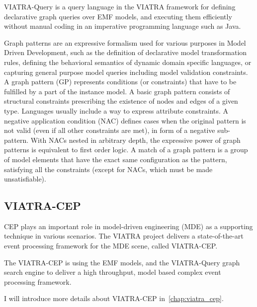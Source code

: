 VIATRA-Query is a query language in the VIATRA framework for defining declarative graph queries over EMF models, and executing them efficiently without manual coding in an imperative programming language such as Java\citep{IncQuery}.

Graph  patterns are  an  expressive  formalism used for various purposes in Model Driven Development,  such  as  the definition of  declarative  model transformation  rules,  defining  the  behavioral  semantics of dynamic domain specific languages, or capturing general purpose model queries including model validation constraints. A graph pattern (GP) represents  conditions  (or  constraints)  that  have  to be fulfilled by a part of the instance model. A basic graph pattern consists of structural constraints prescribing the existence of nodes and edges of a given type. Languages usually include a way to express attribute constraints. A negative application condition (NAC) defines cases when the original pattern is not valid (even if all other constraints are met), in form of a negative sub-pattern. With NACs nested in arbitrary depth, the expressive power of graph patterns is equivalent to first order logic. A match of a graph pattern is a group of model elements that have the exact same configuration as the pattern, satisfying all the constraints (except for NACs, which must be made unsatisfiable)\citep{bergmann2010incremental}.


\subsection{VIATRA-CEP}
CEP plays an important role in model-driven engineering (MDE) as a supporting technique in various scenarios. The VIATRA project delivers a state-of-the-art event processing framework for the MDE scene, called VIATRA-CEP\citep{CEP}. 

The VIATRA-CEP is using the EMF models, and the VIATRA-Query graph search engine to deliver a high throughput, model based complex event processing framework.

I will introduce more details about VIATRA-CEP in~\cref{chap:viatra_cep}.



